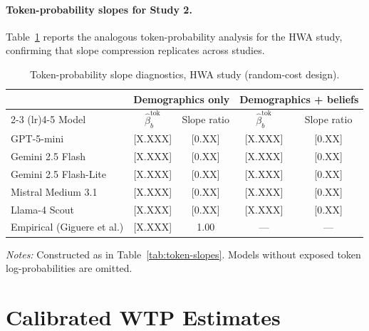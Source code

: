 \documentclass[12pt]{article}
\begin{document}
\paragraph{Token-probability slopes for Study 2.} Table~\ref{tab:hwa-slopes} reports the analogous token-probability analysis for the HWA study, confirming that slope compression replicates across studies.

\begin{table}[h]
    \centering
    \caption{Token-probability slope diagnostics, HWA study (random-cost design).}
    \label{tab:hwa-slopes}
    \begin{threeparttable}
    \begin{tabular}{lcccc}
        \toprule
         & \multicolumn{2}{c}{Demographics only} & \multicolumn{2}{c}{Demographics + beliefs} \\
        \cmidrule(lr){2-3} \cmidrule(lr){4-5}
        Model & $\hat{\beta}_b^{\text{tok}}$ & Slope ratio & $\hat{\beta}_b^{\text{tok}}$ & Slope ratio \\
        \midrule
        GPT-5-mini             & [X.XXX] & [0.XX] & [X.XXX] & [0.XX] \\
        Gemini 2.5 Flash       & [X.XXX] & [0.XX] & [X.XXX] & [0.XX] \\
        Gemini 2.5 Flash-Lite  & [X.XXX] & [0.XX] & [X.XXX] & [0.XX] \\
        Mistral Medium 3.1     & [X.XXX] & [0.XX] & [X.XXX] & [0.XX] \\
        Llama-4 Scout          & [X.XXX] & [0.XX] & [X.XXX] & [0.XX] \\
        \midrule
        Empirical (Giguere et al.) & [X.XXX] & 1.00 & --- & --- \\
        \bottomrule
    \end{tabular}
    \begin{tablenotes}\footnotesize
        \item \textit{Notes:} Constructed as in Table~\ref{tab:token-slopes}. Models without exposed token log-probabilities are omitted.
    \end{tablenotes}
    \end{threeparttable}
\end{table}

\section{Calibrated WTP Estimates}\label{app:calibrated-wtp}
\end{document}
